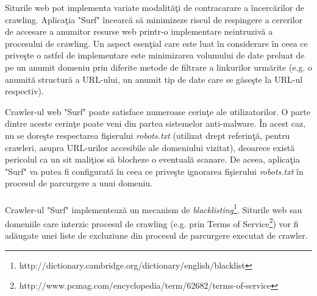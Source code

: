 \newcommand{\blacklistingDefinition}{http://dictionary.cambridge.org/dictionary/english/blacklist}
\newcommand{\tosDefinition}{http://www.pcmag.com/encyclopedia/term/62682/terms-of-service}

Siturile web pot implementa variate modalităţi de contracarare a încercărilor de crawling. Aplicaţia "Surf" încearcă să minimizeze riscul de respingere a cererilor de accesare a anumitor resurse web printr-o implementare neintruzivă a procesului de crawling. Un aspect esenţial care este luat în considerare în ceea ce priveşte o astfel de implementare este minimizarea volumului de date preluat de pe un anumit domeniu prin diferite metode de filtrare a linkurilor urmărite (e.g. o anumită structură a URL-ului, un anumit tip de date care se găseşte la URL-ul respectiv).
	

\noindent
Crawler-ul web "Surf" poate satisface numeroase cerinţe ale utilizatorilor. O parte dintre aceste cerinţe poate veni din partea sistemelor anti-malware. În acest caz, nu se doreşte respectarea fişierului \emph{robots.txt} (utilizat drept referinţă, pentru crawleri, asupra URL-urilor accesibile ale domeniului vizitat), deoarece există pericolul ca un sit maliţios să blocheze o eventuală scanare. De aceea, aplicaţia "Surf" va putea fi configurată în ceea ce priveşte ignorarea fişierului \emph{robots.txt} în procesul de parcurgere a unui domeniu.
\\
\\
Crawler-ul "Surf" implementează un mecanism de \emph{blacklisting}\footnote{\blacklistingDefinition}. Siturile web sau domeniile care interzic procesul de crawling (e.g. prin Terms of Service\footnote{\tosDefinition}) vor fi adăugate unei liste de excluziune din procesul de parcurgere executat de crawler.
